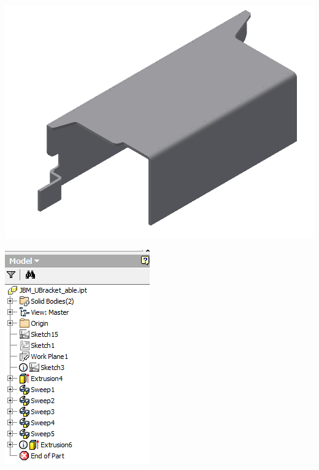 \begin{minipage}{\linewidth}
\begin{minipage}[c]{0.62\linewidth}
\includegraphics[width=\linewidth,valign=t]{images/JBM_UBracket_Able_model}
 \label{fig:results:JBM_UBracket_Able_model}
\end{minipage}
\quad
\begin{minipage}[c]{0.3\linewidth}
\includegraphics[width=\linewidth,valign=t]{images/JBM_UBracket_Able_tree}

\end{minipage}
\end{minipage}
